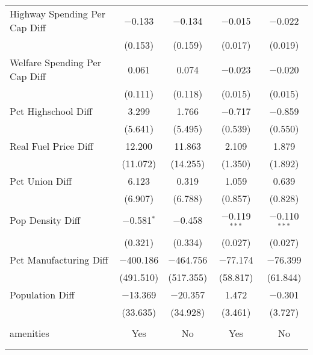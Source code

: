\begin{table}[!htbp]
\begin{tabular}{@{\extracolsep{5pt}}lcccc}
  Highway Spending Per Cap Diff & $-$0.133 & $-$0.134 & $-$0.015 & $-$0.022 \\ 
  & (0.153) & (0.159) & (0.017) & (0.019) \\ 
  Welfare Spending Per Cap Diff & 0.061 & 0.074 & $-$0.023 & $-$0.020 \\ 
  & (0.111) & (0.118) & (0.015) & (0.015) \\ 
  Pct Highschool Diff & 3.299 & 1.766 & $-$0.717 & $-$0.859 \\ 
  & (5.641) & (5.495) & (0.539) & (0.550) \\ 
  Real Fuel Price Diff & 12.200 & 11.863 & 2.109 & 1.879 \\ 
  & (11.072) & (14.255) & (1.350) & (1.892) \\ 
  Pct Union Diff & 6.123 & 0.319 & 1.059 & 0.639 \\ 
  & (6.907) & (6.788) & (0.857) & (0.828) \\ 
  Pop Density Diff & $-$0.581$^{*}$ & $-$0.458 & $-$0.119$^{***}$ & $-$0.110$^{***}$ \\ 
  & (0.321) & (0.334) & (0.027) & (0.027) \\ 
  Pct Manufacturing Diff & $-$400.186 & $-$464.756 & $-$77.174 & $-$76.399 \\ 
  & (491.510) & (517.355) & (58.817) & (61.844) \\ 
  Population Diff & $-$13.369 & $-$20.357 & 1.472 & $-$0.301 \\ 
  & (33.635) & (34.928) & (3.461) & (3.727) \\ 
 \hline \\[-1.8ex] 
amenities & Yes & No & Yes & No \\ 
\hline \\[-1.8ex] 
\hline 
\hline \\[-1.8ex] 
\end{tabular} 
\end{table} 
